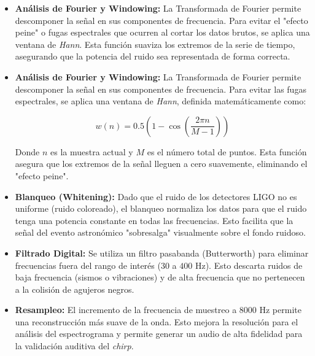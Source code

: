 \documentclass[lettersize,journal]{IEEEtran}
\begin{document}
\begin{itemize}
    \item \textbf{Análisis de Fourier y Windowing:} La Transformada de Fourier permite descomponer la señal en sus componentes de frecuencia. Para evitar el "efecto peine" o fugas espectrales que ocurren al cortar los datos brutos, se aplica una ventana de \textit{Hann}. Esta función suaviza los extremos de la serie de tiempo, asegurando que la potencia del ruido sea representada de forma correcta.

    \item \textbf{Análisis de Fourier y Windowing:} La Transformada de Fourier permite descomponer la señal en sus componentes de frecuencia. Para evitar las fugas espectrales, se aplica una ventana de \textit{Hann}, definida matemáticamente como:

\begin{equation}
w(n) = 0.5 \left( 1 - \cos \left( \frac{2\pi n}{M-1} \right) \right)
\end{equation}

Donde $n$ es la muestra actual y $M$ es el número total de puntos. Esta función asegura que los extremos de la señal lleguen a cero suavemente, eliminando el "efecto peine"\cite{oppenheim}.
    
    \item \textbf{Blanqueo (Whitening):} Dado que el ruido de los detectores LIGO no es uniforme (ruido coloreado), el blanqueo normaliza los datos para que el ruido tenga una potencia constante en todas las frecuencias. Esto facilita que la señal del evento astronómico "sobresalga" visualmente sobre el fondo ruidoso.
    
    \item \textbf{Filtrado Digital:} Se utiliza un filtro pasabanda (Butterworth) para eliminar frecuencias fuera del rango de interés ($30$ a $400$ Hz). Esto descarta ruidos de baja frecuencia (sismos o vibraciones) y de alta frecuencia que no pertenecen a la colisión de agujeros negros.
    
    \item \textbf{Resampleo:} El incremento de la frecuencia de muestreo a $8000$ Hz permite una reconstrucción más suave de la onda. Esto mejora la resolución para el análisis del espectrograma y permite generar un audio de alta fidelidad para la validación auditiva del \textit{chirp}.
\end{itemize}
\end{document}
